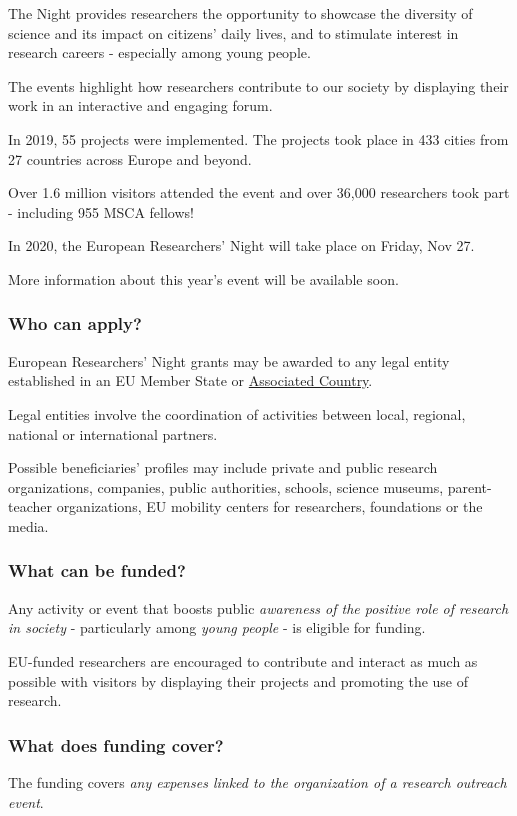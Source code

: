 \documentclass[oneside]{book}
\numberwithin{equation}{section}
\begin{document}
The Night provides researchers the opportunity to showcase the diversity of science and its impact on citizens' daily lives, and to stimulate interest in research careers - especially among young people.

The events highlight how researchers contribute to our society by displaying their work in an interactive and engaging forum.

%
In 2019, 55 projects were implemented. The projects took place in 433 cities from 27 countries across Europe and beyond.

Over 1.6 million visitors attended the event and over 36,000 researchers took part - including 955 MSCA fellows!

%
In 2020, the European Researchers' Night will take place on Friday, Nov 27.

More information about this year's event will be available soon.

\subsubsection{Who can apply?}
European Researchers' Night grants may be awarded to any legal entity established in an EU Member State or \href{http://ec.europa.eu/research/participants/data/ref/h2020/grants_manual/hi/3cpart/h2020-hi-list-ac_en.pdf}{Associated Country}.

Legal entities involve the coordination of activities between local, regional, national or international partners.

%
Possible beneficiaries' profiles may include private and public research organizations, companies, public authorities, schools, science museums, parent-teacher organizations, EU mobility centers for researchers, foundations or the media.

\subsubsection{What can be funded?}
Any activity or event that boosts public \textit{awareness of the positive role of research in society} - particularly among \textit{young people} - is eligible for funding.

%
EU-funded researchers are encouraged to contribute and interact as much as possible with visitors by displaying their projects and promoting the use of research.

\subsubsection{What does funding cover?}
The funding covers \textit{any expenses linked to the organization of a research outreach event}.
\end{document}
